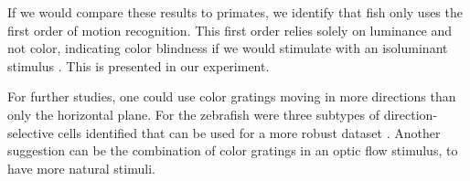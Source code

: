 \vspace{\baselineskip}

If we would compare these results to primates, we identify that fish only uses the first order of motion recognition. This first order relies solely on luminance and not color, indicating color blindness if we would stimulate with an isoluminant stimulus \parencite{orgerChannelingRedGreen2005, zhong1999isoluminant}. This is presented in our experiment. 

\vspace{\baselineskip}

For further studies, one could use color gratings moving in more directions than only the horizontal plane. For the zebrafish were three subtypes of direction-selective cells identified that can be used for a more robust dataset \parencite{nikolaou2012parametric}. Another suggestion can be the combination of color gratings in an optic flow stimulus, to have more natural stimuli. 

